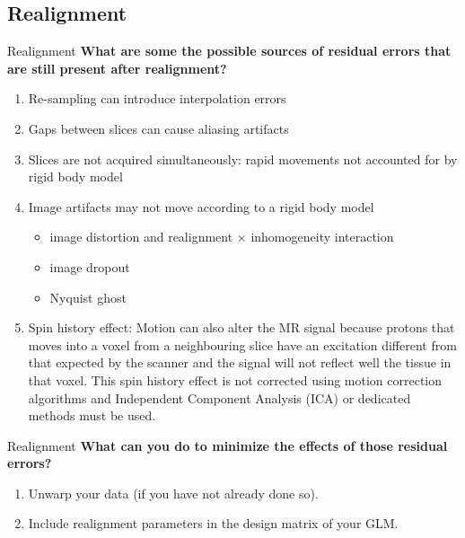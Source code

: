 \documentclass{beamer}
\begin{document}

\subsection[Realignment]{Realignment}

\begin{frame}{Realignment}
\textbf{What are some the possible sources of residual errors that are still present after realignment?}

\smallskip 
    \begin{enumerate}
      \item Re-sampling can introduce interpolation errors
      \item Gaps between slices can cause aliasing artifacts
      \item Slices are not acquired simultaneously: rapid movements not accounted for by rigid body model
      \item Image artifacts may not move according to a rigid body model
      \begin{itemize}\footnotesize
	  \item image distortion and realignment $\times$ inhomogeneity interaction
	  \item image dropout
	  \item Nyquist ghost
      \end{itemize}
      \item Spin history effect: Motion can also alter the MR signal because protons that moves into a voxel from a neighbouring slice have an excitation different from that expected by the scanner and the signal will not reflect well the tissue in that voxel. This spin history effect is not corrected using motion correction algorithms and Independent Component Analysis (ICA) or dedicated methods must be used.

    \end{enumerate}  
\end{frame}


\begin{frame}{Realignment}
\textbf{What can you do to minimize the effects of those residual errors?}

\smallskip 
    \begin{enumerate}
      \item Unwarp your data (if you have not already done so).
      \item Include realignment parameters in the design matrix of your GLM.
    \end{enumerate}  
\end{frame}
\end{document}
